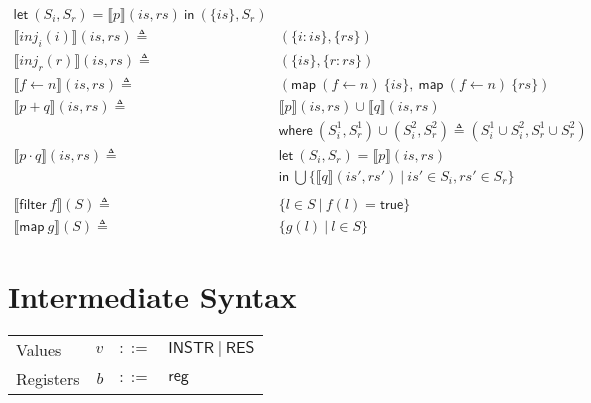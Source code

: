 \documentclass[12pt, letterpaper]{article}
\newcommand\interp[1]{\llbracket #1 \rrbracket}
\begin{document}
\begin{align*}
      \mathsf{let}\ (S_i,S_r) = \interp {p}(\mathit{is}, \mathit{rs})\ 
      \mathsf{in}\ (\{\mathit{is}\}, S_r)
      \\
    \interp { inj_{i}(i) }(\mathit{is}, \mathit{rs})
      \triangleq\ &
      (\{\mathit{i : is}\}, \{\mathit{rs}\}) 
      \\
    \interp { inj_{r}(r) }(\mathit{is}, \mathit{rs})
      \triangleq\ &
      (\{\mathit{is}\},\{ \mathit{r : rs}\})
      \\
    \interp { f \leftarrow n }(is, rs)
      \triangleq\ &
      (\mathsf{map}\ (f\leftarrow n)\ \{is\},\
       \mathsf{map}\ (f\leftarrow n)\ \{rs\})
      \\ %
    \interp { p + q }(\mathit{is}, \mathit{rs})
      \triangleq\ &
      \interp { p }(\mathit{is}, \mathit{rs})\cup
      \interp { q }(\mathit{is}, \mathit{rs}) \\
      &\mathsf{where}\ (S_i^1, S_r^1)\cup (S_i^2, S_r^2)\triangleq
        (S_i^1\cup S_i^2, S_r^1\cup S_r^2)\\
    \interp { p \cdot q }(\mathit{is}, \mathit{rs})
      \triangleq\ &
      \mathsf{let}\ (S_i, S_r) = \interp{p}(is, rs)\\
      &\mathsf{in}\ \bigcup \{\interp{q}(\mathit{is}',\mathit{rs}')\ |\ \mathit{is}'\in S_i, \mathit{rs'}\in S_r\}\\
      \\
    \interp{\mathsf{filter}\ f}(S)
      \triangleq\ & \{l \in S\ |\ f(l) = \mathsf{true}\}\\
    \interp{\mathsf{map}\ g}(S)
      \triangleq\ &
      \{ g(l)\ |\ l\in S \} 
  \end{align*}


\newpage
\section{Intermediate Syntax}

  \begin{tabular}{l r c l}
    Values        & $v$     & $::=$     & $\mathsf{INSTR\ |\ RES}$\\
    Registers     & $b$     & $::=$     & $\mathsf{reg}$
  \end{tabular}\\
\end{document}
